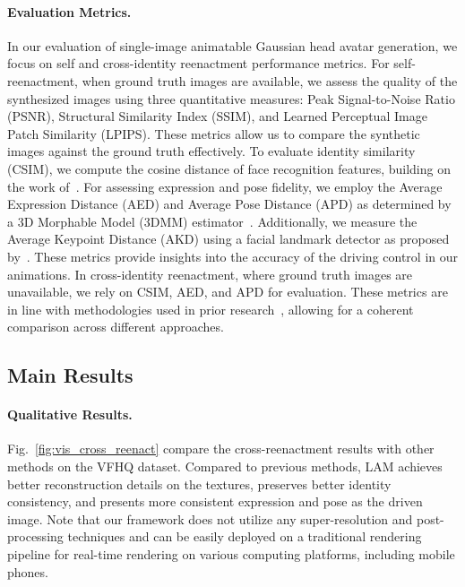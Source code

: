 \paragraph{\textbf{Evaluation Metrics.}}
In our evaluation of single-image animatable Gaussian head avatar generation, we focus on self and cross-identity reenactment performance metrics. For self-reenactment, when ground truth images are available, we assess the quality of the synthesized images using three quantitative measures: Peak Signal-to-Noise Ratio (PSNR), Structural Similarity Index (SSIM), and Learned Perceptual Image Patch Similarity (LPIPS). These metrics allow us to compare the synthetic images against the ground truth effectively. To evaluate identity similarity (CSIM), we compute the cosine distance of face recognition features, building on the work of~\cite{ArcFace}. For assessing expression and pose fidelity, we employ the Average Expression Distance (AED) and Average Pose Distance (APD) as determined by a 3D Morphable Model (3DMM) estimator~\cite{AEDAPD}. Additionally, we measure the Average Keypoint Distance (AKD) using a facial landmark detector as proposed by~\cite{AKD}. These metrics provide insights into the accuracy of the driving control in our animations. In cross-identity reenactment, where ground truth images are unavailable, we rely on CSIM, AED, and APD for evaluation. These metrics are in line with methodologies used in prior research~\cite{GAGAvatar}, allowing for a coherent comparison across different approaches. 


\subsection{Main Results}
\paragraph{\textbf{Qualitative Results.}}
Fig.~\ref{fig:vis_cross_reenact} compare the cross-reenactment results with other methods on the VFHQ dataset. Compared to previous methods, LAM achieves better reconstruction details on the textures, preserves better identity consistency, and presents more consistent expression and pose as the driven image. Note that our framework does not utilize any super-resolution and post-processing techniques and can be easily deployed on a traditional rendering pipeline for real-time rendering on various computing platforms, including mobile phones.

